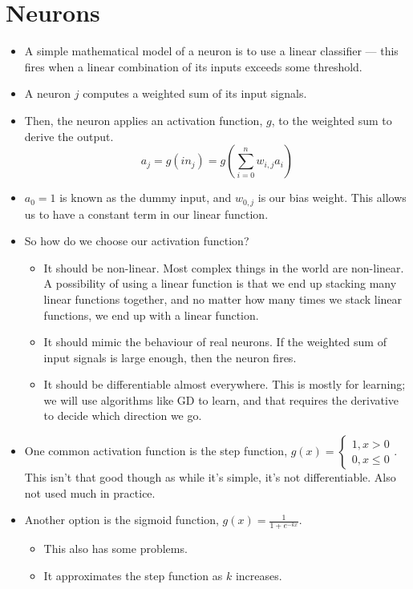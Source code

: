 \documentclass{article}
\begin{document}
\section{Neurons}
\begin{itemize}
    \item A simple mathematical model of a neuron is to use a linear classifier --- this fires when a linear combination of its inputs exceeds some threshold.
    \item A neuron $j$ computes a weighted sum of its input signals.
    \item Then, the neuron applies an activation function, $g$, to the weighted sum to derive the output.
    \[a_j = g(in_j) = g(\sum_{i = 0}^n w_{i, j} a_i)\]
    \item $a_0 = 1$ is known as the dummy input, and $w_{0, j}$ is our bias weight.  This allows us to have a constant term in our linear function.
    \item So how do we choose our activation function?
        \begin{itemize}
            \item It should be non-linear.  Most complex things in the world are non-linear.  A possibility of using a linear function is that we end up stacking many linear functions together, and no matter how many times we stack linear functions, we end up with a linear function.
            \item It should mimic the behaviour of real neurons.  If the weighted sum of input signals is large enough, then the neuron fires.
            \item It should be differentiable almost everywhere.  This is mostly for learning; we will use algorithms like GD to learn, and that requires the derivative to decide which direction we go.
        \end{itemize}
    \item One common activation function is the step function, $g(x) = \begin{cases}1, x > 0 \\ 0, x \leq 0\end{cases}$.  This isn't that good though as while it's simple, it's not differentiable.  Also not used much in practice.
    \item Another option is the sigmoid function, $g(x) = \frac{1}{1 + e^{-kx}}$.
        \begin{itemize}
            \item This also has some problems.
            \item It approximates the step function as $k$ increases.

\end{itemize}
\end{itemize}
\end{document}

